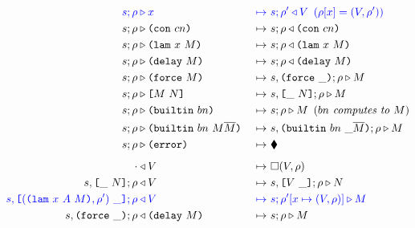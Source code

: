 \documentclass[../plutus-core-specification.tex]{subfiles}
\begin{document}
\begin{figure}[H]
\ContinuedFloat
  \begin{subfigure}[c]{\linewidth}

    \begin{minipage}{\linewidth}
\begin{alignat*}{2}
  \blue{s; \rho} & \bcompute \blue{x} &~\bmapsto~ &\blue{s;\rho^{\prime} \return V \enspace (\rho[x] = (V,\rho^{\prime}))}\\
  s;\rho & \compute \con{cn}                          &~\mapsto~& s;\rho \return \con{cn}\\
  s;\rho & \compute \lamU{x}{M}                       &~\mapsto~& s;\rho \return \lamU{x}{M}\\
  s;\rho & \compute \delay{M}                         &~\mapsto~& s;\rho \return \delay{M}\\
  s;\rho & \compute \force{M}                         &~\mapsto~& s,\inForceFrame{};\rho \compute M \\
  s;\rho & \compute \appU{M}{N}                       &~\mapsto~& s,\inAppLeftFrame{N};\rho \compute M\\
  s;\rho & \compute \builtinU{bn}{\!\!}               &~\mapsto~& s;\rho \compute M
                                                 \enspace (\textit{$bn$ computes to $M$}) \\
  s;\rho & \compute \builtinU{bn}{M \repetition{M}}   &~\mapsto~& s,\inBuiltinU{bn}{}{\_}{\repetition{M}};\rho \compute M\\
  s;\rho & \compute \errorU                           &~\mapsto~& \ckerror{}\\
  \\[-10pt] %
  \cdot & \return V                              &~\mapsto~& \square (V,\rho)\\
  s,\inAppLeftFrame{N};\rho& \return V               &~\mapsto~& s,\inAppRightFrame{V};\rho \compute N\\
  \blue{s,\inAppRightFrame{(\lam{x}{A}{M}, \rho^{\prime})}; \rho} &\breturn V &~\bmapsto~& \blue{s;\rho^{\prime}[x\mapsto (V,\rho)] \compute M}\\  %
  s,\inForceFrame{};\rho & \return \delay{M}          &~\mapsto~& s;\rho \compute M\\

\end{alignat*}
\end{minipage}
\end{subfigure}
\end{figure}
\end{document}
